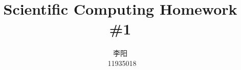 \documentclass[10pt,a4paper]{article}
\title{Scientific Computing Homework \#1}
\author{\begin{CJK*}{UTF8}{gkai}
    李阳
    \end{CJK*}\, 11935018}
\begin{document}
\maketitle

\renewcommand\theenumi{\roman{enumi}}
\renewcommand\labelenumi{(\theenumi)}














\end{document}
